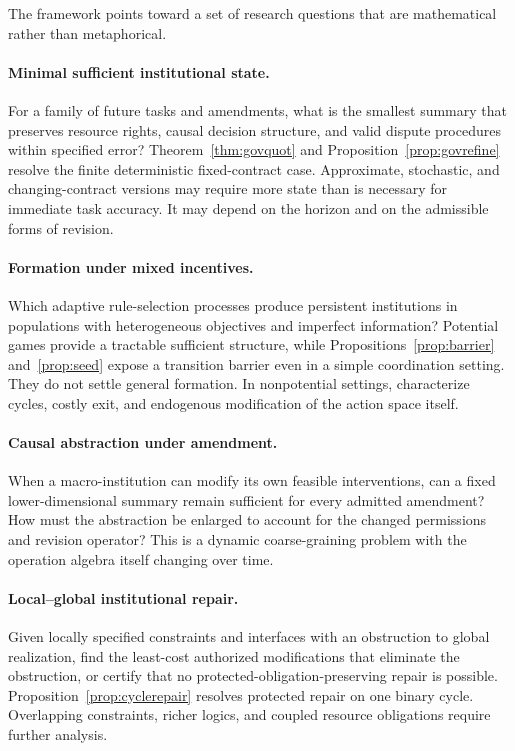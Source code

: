 \documentclass[11pt,letterpaper]{article}
\theoremstyle{plain}
\theoremstyle{definition}
\theoremstyle{remark}
\begin{document}
The framework points toward a set of research questions that are mathematical rather than metaphorical.

\paragraph{Minimal sufficient institutional state.}
For a family of future tasks and amendments, what is the smallest summary that preserves resource rights, causal decision structure, and valid dispute procedures within specified error? Theorem~\ref{thm:govquot} and Proposition~\ref{prop:govrefine} resolve the finite deterministic fixed-contract case. Approximate, stochastic, and changing-contract versions may require more state than is necessary for immediate task accuracy. It may depend on the horizon and on the admissible forms of revision.

\paragraph{Formation under mixed incentives.}
Which adaptive rule-selection processes produce persistent institutions in populations with heterogeneous objectives and imperfect information? Potential games provide a tractable sufficient structure, while Propositions~\ref{prop:barrier} and~\ref{prop:seed} expose a transition barrier even in a simple coordination setting. They do not settle general formation. In nonpotential settings, characterize cycles, costly exit, and endogenous modification of the action space itself.

\paragraph{Causal abstraction under amendment.}
When a macro-institution can modify its own feasible interventions, can a fixed lower-dimensional summary remain sufficient for every admitted amendment? How must the abstraction be enlarged to account for the changed permissions and revision operator? This is a dynamic coarse-graining problem with the operation algebra itself changing over time.

\paragraph{Local--global institutional repair.}
Given locally specified constraints and interfaces with an obstruction to global realization, find the least-cost authorized modifications that eliminate the obstruction, or certify that no protected-obligation-preserving repair is possible. Proposition~\ref{prop:cyclerepair} resolves protected repair on one binary cycle. Overlapping constraints, richer logics, and coupled resource obligations require further analysis.
\end{document}
